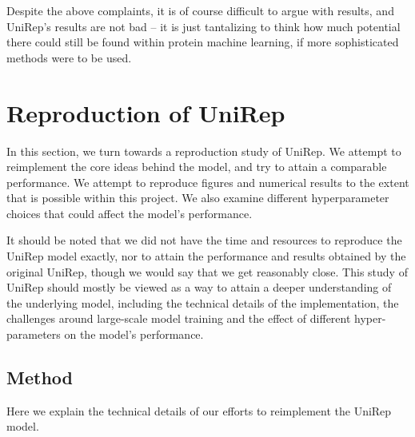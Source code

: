 \documentclass[a4paper,12pt]{article}
\begin{document}
Despite the above complaints, it is of course difficult to argue with results, and UniRep's results are not bad -- it is just tantalizing to think how much potential there could still be found within protein machine learning, if more sophisticated methods were to be used.






\clearpage
\section{Reproduction of UniRep}
\label{section:unirep_reproduction}
In this section, we turn towards a reproduction study of UniRep. We attempt to reimplement the core ideas behind the model, and try to attain a comparable performance. We attempt to reproduce figures and numerical results to the extent that is possible within this project. We also examine different hyperparameter choices that could affect the model's performance.

It should be noted that we did not have the time and resources to reproduce the UniRep model exactly, nor to attain the performance and results obtained by the original UniRep, though we would say that we get reasonably close. This study of UniRep should mostly be viewed as a way to attain a deeper understanding of the underlying model, including the technical details of the implementation, the challenges around large-scale model training and the effect of different hyper-parameters on the model's performance.

\subsection{Method}
\label{section:reproduction_method}
Here we explain the technical details of our efforts to reimplement the UniRep model.
\end{document}
